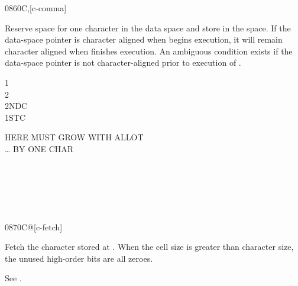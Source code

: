 \begin{worddef}{0860}{C,}[c-comma]
\item {}

	Reserve space for one character in the data space and store
	 in the space. If the data-space pointer is character
	aligned when  begins execution, it will remain character
	aligned when  finishes execution.
	An ambiguous condition exists if the data-space pointer is not
	character-aligned prior to execution of .


	\begin{testing} %
		\ttfamily
		 1  \\
		 2  \\
		 2NDC \\
		 1STC

			 HERE MUST GROW WITH ALLOT \\
				 {\ldots} BY ONE CHAR \\
		 \\
		 \\
		 \\
		 \\
		 \\
	\end{testing}
\end{worddef}


\begin{worddef}{0870}{C@}[c-fetch]
\item {}

	Fetch the character stored at . When the cell size is
	greater than character size, the unused high-order bits are all
	zeroes.


	\begin{testing} %
		See .
	\end{testing}
\end{worddef}


